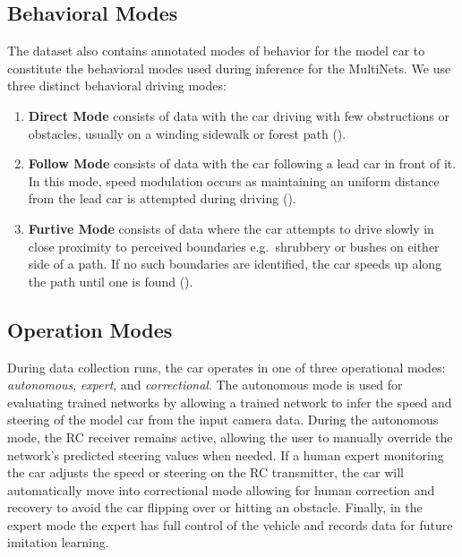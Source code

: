 \subsection{Behavioral Modes}

The dataset also contains annotated modes of behavior for the model car to constitute the behavioral modes used during inference for the MultiNets. We use three distinct behavioral driving modes:

\begin{enumerate}
    \item \textbf{Direct Mode} consists of data with the car driving with few obstructions or obstacles, usually on a winding sidewalk or forest path ().
    \item \textbf{Follow Mode} consists of data with the car following a lead car in front of it. In this mode, speed modulation occurs as maintaining an uniform distance from the lead car is attempted during driving ().
    \item \textbf{Furtive Mode} consists of data where the car attempts to drive slowly in close proximity to perceived boundaries e.g.\ shrubbery or bushes on either side of a path. If no such boundaries are identified, the car speeds up along the path until one is found ().
\end{enumerate}

%

\subsection{Operation Modes}
During data collection runs, the car operates in one of three operational modes: \textit{autonomous}, \textit{expert}, and \textit{correctional}. The autonomous mode is used for evaluating trained networks by allowing a trained network to infer the speed and steering of the model car from the input camera data. During the autonomous mode, the RC receiver remains active, allowing the user to manually override the network's predicted steering values when needed. If a human expert monitoring the car adjusts the speed or steering on the RC transmitter, the car will automatically move into correctional mode allowing for human correction and recovery to avoid the car flipping over or hitting an obstacle. Finally, in the expert mode the expert has full control of the vehicle and records data for future imitation learning.

